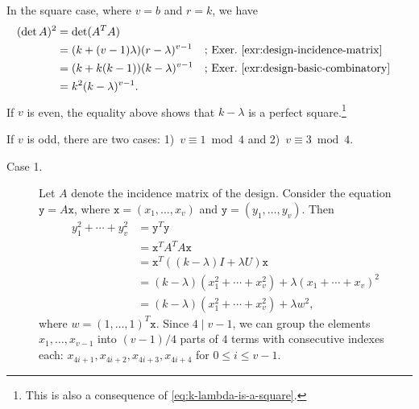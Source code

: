 \begin{solution}
    In the square case, where $v=b$ and $r=k$, we have
    \begin{align*}
        (\det A)^2 &= \det(A^TA)\\
            &= (k+(v-1)\lambda)(r-\lambda)^{v-1}
                &&\text{; Exer.~\ref{exr:design-incidence-matrix}}\\
            &= (k+k(k-1))(k-\lambda)^{v-1}
                &&\text{; Exer.~\ref{exr:design-basic-combinatory}}\\
            &= k^2(k-\lambda)^{v-1}.
    \end{align*}
    If $v$ is even, the equality above shows that $k-\lambda$ is a perfect square.\footnote{This is also a consequence of \eqref{eq:k-lambda-is-a-square}.}

    If $v$ is odd, there are two cases: 1)~$v\equiv1\bmod 4$ and 2)~$v\equiv3\bmod 4$.

    \begin{description}
        \item[Case 1.] Let $A$ denote the incidence matrix of the design. Consider the equation $\mathtt y=A\mathtt x$, where $\mathtt x=(x_1,\dots,x_v)$ and $\mathtt y=(y_1,\dots,y_v)$. Then
        \begin{align*}
            y_1^2+\cdots+y_v^2 &= \mathtt y^T\mathtt y\\
                &= \mathtt x^TA^T\!A\mathtt x\\
                &= \mathtt x^T((k-\lambda)I
                    +\lambda U)\mathtt x\\
                &= (k-\lambda)(x_1^2+\cdots+x_v^2) 
                    +\lambda(x_1+\cdots+x_v)^2\\
                &= (k-\lambda)(x_1^2+\cdots+x_v^2) + \lambda w^2,
        \end{align*}
        where $w=(1,\dots,1)^T\mathtt x$. Since $4\mid v-1$, we can group the elements $x_1,\dots, x_{v-1}$ into $(v-1)/4$ parts of $4$ terms with consecutive indexes each: $x_{4i+1},x_{4i+2},x_{4i+3},x_{4i+4}$ for $0\le i\le v-1$. 
        

\end{description}
\end{solution}
